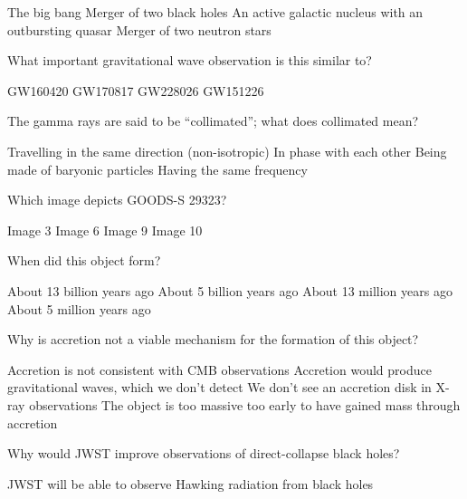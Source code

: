 \documentclass{exam}
\begin{document}
\begin{multicols*}{2}
\begin{questions}
	\begin{choices}
	\choice The big bang
	\choice Merger of two black holes
	\choice An active galactic nucleus with an outbursting quasar
	\CorrectChoice Merger of two neutron stars
	\end{choices}
\end{questions}
\vfill\null\columnbreak
\begin{questions}
\setcounter{question}{30}
\question What important gravitational wave observation is this similar to?
	\begin{choices}
	\choice GW160420
	\CorrectChoice GW170817
	\choice GW228026
	\choice GW151226
	\end{choices}
\question The gamma rays are said to be “collimated”; what does collimated mean?
	\begin{choices}
	\CorrectChoice Travelling in the same direction (non-isotropic)
	\choice In phase with each other
	\choice Being made of baryonic particles
	\choice Having the same frequency
	\end{choices}
\end{questions}
\hrulefill
\begin{questions}
\setcounter{question}{32}
\question Which image depicts GOODS-S 29323?
	\begin{choices}
	\choice Image 3
	\CorrectChoice Image 6
	\choice Image 9
	\choice Image 10
	\end{choices}
\question When did this object form?
	\begin{choices}
	\CorrectChoice About 13 billion years ago 
	\choice About 5 billion years ago
	\choice About 13 million years ago
	\choice About 5 million years ago
	\end{choices}
\question Why is accretion not a viable mechanism for the formation of this object?
	\begin{choices}
	\choice Accretion is not consistent with CMB observations
	\choice Accretion would produce gravitational waves, which we don’t detect
	\choice We don’t see an accretion disk in X-ray observations
	\CorrectChoice The object is too massive too early to have gained mass through accretion
	\end{choices}
\end{questions}
\vfill\null\columnbreak
\begin{questions}
\setcounter{question}{35}
\question Why would JWST improve observations of direct-collapse black holes?
	\begin{choices}
	\choice JWST will be able to observe Hawking radiation from black holes

\end{choices}
\end{questions}
\end{multicols*}
\end{document}
